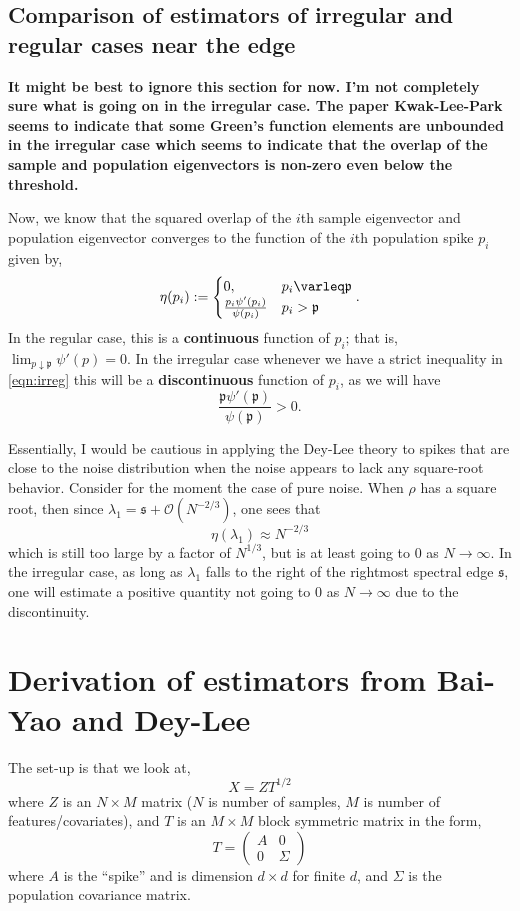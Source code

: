 \documentclass[11 pt, reqno]{article}
\def\beq{\begin{equation}}
\def\eeq{\end{equation}}
\def\mfp{\mathfrak{p}}
\def\mfs{\mathfrak{s}}
\renewcommand\leq\varleq
\def\O{\mathcal{O}}
\begin{document}
\subsection{Comparison of estimators of irregular and regular cases near the edge}

{\bf It might be best to ignore this section for now.  I'm not completely sure what is going on in the irregular case.  The paper Kwak-Lee-Park seems to indicate that some Green's function elements are unbounded in the irregular case which seems to indicate that the overlap of the sample and population eigenvectors is non-zero even below the threshold.}

Now, we know that the  squared overlap of the $i$th sample eigenvector and population eigenvector converges to the function of the $i$th population spike $p_i$ given by,
\beq
\eta (p_i ) := \begin{cases} 0 ,  & p_i \leq \mfp \\
\frac{p_i \psi' ( p_i  ) }{ \psi ( p_i ) } & p_i > \mfp \end{cases}.
\eeq
In the regular case, this is a {\bf continuous } function of $p_i$; that is, $\lim_{p \downarrow \mfp } \psi' (p) = 0$.  In the irregular case whenever we have a strict inequality in \eqref{eqn:irreg} this will be a {\bf discontinuous} function of $p_i$, as we will have
\beq
\frac{ \mfp  \psi' ( \mfp ) }{ \psi ( \mfp ) } > 0 .
\eeq

Essentially, I would be cautious in applying the Dey-Lee theory to spikes that are close to the noise distribution when the noise appears to lack any square-root behavior.  Consider for the moment the case of pure noise.  When $\rho$ has a square root, then since $\lambda_1 = \mfs + \O ( N^{-2/3} )$, one sees that 
\beq
\eta ( \lambda_1 ) \approx N^{-2/3}
\eeq
which is still too large by a factor of $N^{1/3}$, but is at least going to $0$ as $N \to \infty$.  In the irregular case, as long as $\lambda_1$ falls to the right of the rightmost spectral edge $\mfs$, one will estimate a positive quantity not going to $0$ as $N \to \infty$ due to the discontinuity.  

\section{Derivation of estimators from Bai-Yao and Dey-Lee}

\label{sec:estimators}
The set-up is that we look at,
\beq
X = Z T^{1/2} 
\eeq
where $Z$ is an $N \times M$ matrix ($N$ is number of samples, $M$ is number of features/covariates), and $T$ is an $M \times M$ block symmetric matrix in the form,
\beq
T = \left( \begin{matrix} A & 0 \\ 0 & \Sigma \end{matrix} \right)
\eeq
where $A$ is the ``spike'' and is dimension $d \times d$ for finite $d$, and $\Sigma$ is the population covariance matrix.
\end{document}
